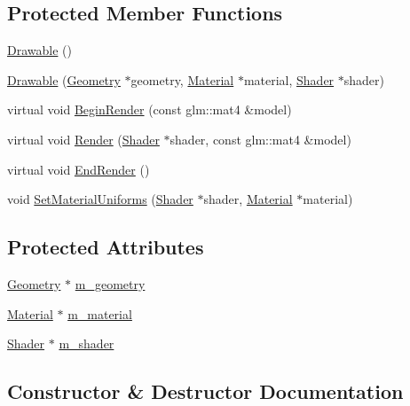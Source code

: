 \subsection*{Protected Member Functions}
\begin{DoxyCompactItemize}
\item 
\mbox{\hyperlink{classngl_1_1_drawable_ad815031b7a8f997364dcbee94fa4bc91}{Drawable}} ()
\item 
\mbox{\hyperlink{classngl_1_1_drawable_a8d21b3491e08f42b7e7229bc4dab5b44}{Drawable}} (\mbox{\hyperlink{classngl_1_1_geometry}{Geometry}} $\ast$geometry, \mbox{\hyperlink{classngl_1_1_material}{Material}} $\ast$material, \mbox{\hyperlink{classngl_1_1_shader}{Shader}} $\ast$shader)
\item 
virtual void \mbox{\hyperlink{classngl_1_1_drawable_ab40302e5e2afebf13184f59d4aedddaf}{Begin\+Render}} (const glm\+::mat4 \&model)
\item 
virtual void \mbox{\hyperlink{classngl_1_1_drawable_a11be86a78602d58bda7ce1331e23658c}{Render}} (\mbox{\hyperlink{classngl_1_1_shader}{Shader}} $\ast$shader, const glm\+::mat4 \&model)
\item 
virtual void \mbox{\hyperlink{classngl_1_1_drawable_a52762022cfb59cceb5259f4e8775401b}{End\+Render}} ()
\item 
void \mbox{\hyperlink{classngl_1_1_drawable_a6d09c1127610298df8ad1a053486b91c}{Set\+Material\+Uniforms}} (\mbox{\hyperlink{classngl_1_1_shader}{Shader}} $\ast$shader, \mbox{\hyperlink{classngl_1_1_material}{Material}} $\ast$material)
\end{DoxyCompactItemize}
\subsection*{Protected Attributes}
\begin{DoxyCompactItemize}
\item 
\mbox{\hyperlink{classngl_1_1_geometry}{Geometry}} $\ast$ \mbox{\hyperlink{classngl_1_1_drawable_a2c1079df525baf277b99726965d9e2c3}{m\+\_\+geometry}}
\item 
\mbox{\hyperlink{classngl_1_1_material}{Material}} $\ast$ \mbox{\hyperlink{classngl_1_1_drawable_aeb87e960367869c0e911a6f9f9054fda}{m\+\_\+material}}
\item 
\mbox{\hyperlink{classngl_1_1_shader}{Shader}} $\ast$ \mbox{\hyperlink{classngl_1_1_drawable_acf18737209928e853671afdec880558c}{m\+\_\+shader}}
\end{DoxyCompactItemize}


\subsection{Constructor \& Destructor Documentation}
\mbox{\label{classngl_1_1_drawable_a4c53e2d708da24da5d2a0222f54fa75d}} 
